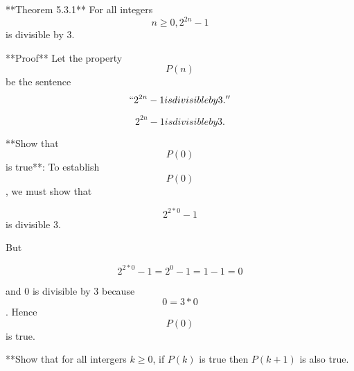 \documentclass[12pt]{document}
\begin{document}
**Theorem 5.3.1**
For all integers $$ n ≥ 0, 2^{2n} - 1 $$ is divisible by 3.

**Proof**
Let the property $$ P(n) $$ be the sentence $$ ``2^{2n} - 1 is divisible by 3. ''$$

$$ 2^{2n} - 1 is divisible by 3. $$

**Show that $$ P(0) $$ is true**:
To establish $$ P(0) $$, we must show that

$$ 2^{2 * 0} -1 $$ is divisible 3.

But

$$ 2^{2*0} - 1 = 2^0 - 1 = 1 - 1 = 0 $$

and 0 is divisible by 3 because $$ 0 = 3 * 0 $$. Hence $$ P(0) $$ is true.

**Show that for all intergers $ k ≥ 0 $, if $P(k)$ is true then $P(k + 1)$ is also true.
\end{document}
